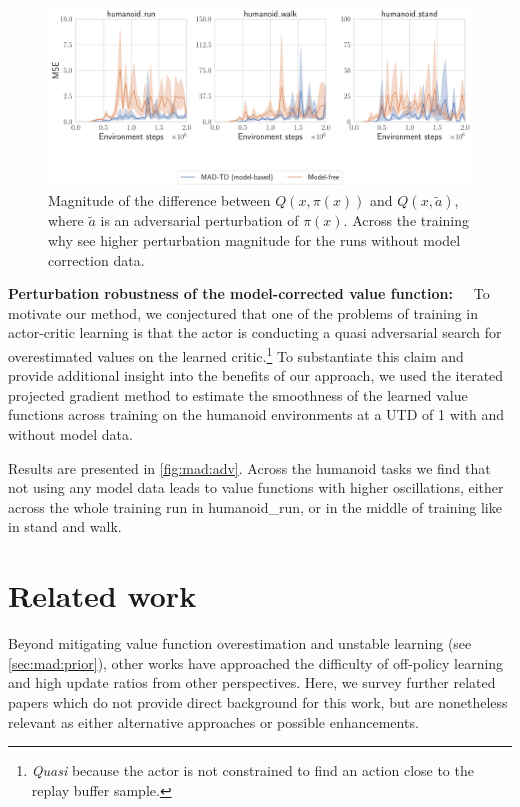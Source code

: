 \begin{figure}[t]
    \centering
    \includegraphics[width=0.75\linewidth]{figures/mad-td/adv_examples.pdf}
    \caption{Magnitude of the difference between $Q(x,\pi(x))$ and $Q(x,\tilde{a})$, where $\tilde{a}$ is an adversarial perturbation of $\pi(x)$. Across the training why see higher perturbation magnitude for the runs without model correction data.}
    \label{fig:mad:adv}
\end{figure}

\textbf{Perturbation robustness of the model-corrected value function:}~~~To motivate our method, we conjectured that one of the problems of training in actor-critic learning is that the actor is conducting a quasi adversarial search for overestimated values on the learned critic.\footnote{\emph{Quasi} because the actor is not constrained to find an action close to the replay buffer sample.}
To substantiate this claim and provide additional insight into the benefits of our approach, we used the iterated projected gradient method \textcite{madry2018towards} to estimate the smoothness of the learned value functions across training on the humanoid environments at a UTD of 1 with and without model data.

Results are presented in \autoref{fig:mad:adv}.
Across the humanoid tasks we find that not using any model data leads to value functions with higher oscillations, either across the whole training run in \textsf{\small humanoid\_run}, or in the middle of training like in \textsf{\small stand} and \textsf{\small walk}.


\section{Related work}

Beyond mitigating value function overestimation and unstable learning (see \autoref{sec:mad:prior}), other works have approached the difficulty of off-policy learning and high update ratios from other perspectives.
Here, we survey further related papers which do not provide direct background for this work, but are nonetheless relevant as either alternative approaches or possible enhancements.

